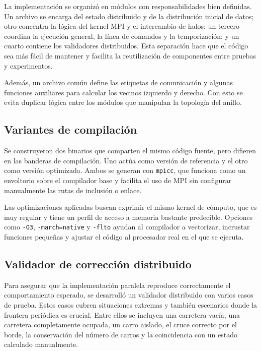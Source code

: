La implementación se organizó en módulos con responsabilidades bien definidas. Un archivo se encarga del estado distribuido y de la distribución inicial de datos; otro concentra la lógica del kernel MPI y el intercambio de halos; un tercero coordina la ejecución general, la línea de comandos y la temporización; y un cuarto contiene los validadores distribuidos. Esta separación hace que el código sea más fácil de mantener y facilita la reutilización de componentes entre pruebas y experimentos.

Además, un archivo común define las etiquetas de comunicación y algunas funciones auxiliares para calcular los vecinos izquierdo y derecho. Con esto se evita duplicar lógica entre los módulos que manipulan la topología del anillo.

\subsection{Variantes de compilación}

Se construyeron dos binarios que comparten el mismo código fuente, pero difieren en las banderas de compilación. Uno actúa como versión de referencia y el otro como versión optimizada. Ambos se generan con \texttt{mpicc}, que funciona como un envoltorio sobre el compilador base y facilita el uso de MPI sin configurar manualmente las rutas de inclusión o enlace.

Las optimizaciones aplicadas buscan exprimir el mismo kernel de cómputo, que es muy regular y tiene un perfil de acceso a memoria bastante predecible. Opciones como \texttt{-O3}, \texttt{-march=native} y \texttt{-flto} ayudan al compilador a vectorizar, incrustar funciones pequeñas y ajustar el código al procesador real en el que se ejecuta.

\subsection{Validador de corrección distribuido}

Para asegurar que la implementación paralela reproduce correctamente el comportamiento esperado, se desarrolló un validador distribuido con varios casos de prueba. Estos casos cubren situaciones extremas y también escenarios donde la frontera periódica es crucial. Entre ellos se incluyen una carretera vacía, una carretera completamente ocupada, un carro aislado, el cruce correcto por el borde, la conservación del número de carros y la coincidencia con un estado calculado manualmente.

